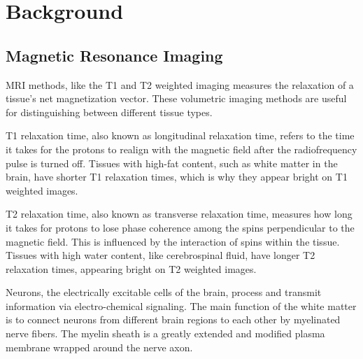 \section{Background}

\subsection{Magnetic Resonance Imaging}

\ac{MRI} methods, like the T1 and T2 weighted imaging measures the relaxation of a tissue's net magnetization vector. \cite{t1} These volumetric imaging methods are useful for distinguishing between different tissue types.\par
T1 relaxation time, also known as longitudinal relaxation time, refers to the time it takes for the protons to realign with the magnetic field after the radiofrequency pulse is turned off. Tissues with high-fat content, such as white matter in the brain, have shorter T1 relaxation times, which is why they appear bright on T1 weighted images. \cite{t1t2}\par
T2 relaxation time, also known as transverse relaxation time, measures how long it takes for protons to lose phase coherence among the spins perpendicular to the magnetic field. This is influenced by the interaction of spins within the tissue. Tissues with high water content, like cerebrospinal fluid, have longer T2 relaxation times, appearing bright on T2 weighted images. \cite{t1t2}\par

Neurons, the electrically excitable cells of the brain, process and transmit information via electro-chemical signaling. \cite{brain} The main function of the white matter is to connect neurons from different brain regions to each other by myelinated nerve fibers. \cite{white} The myelin sheath is a greatly extended and modified plasma membrane wrapped around the nerve axon. \cite{myelin}\par

